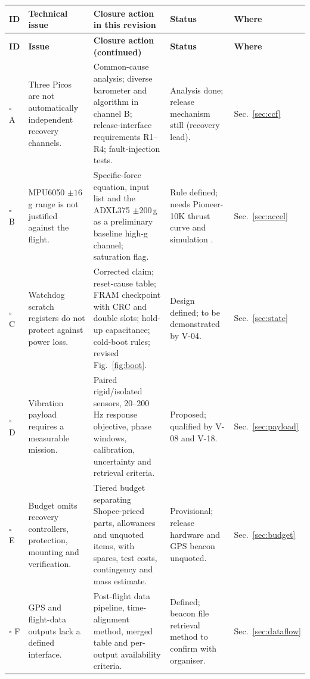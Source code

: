 \small
\begingroup
{}
\begin{longtable}{@{}L{8mm}L{36mm}L{56mm}L{28mm}L{18mm}@{}}
\toprule{}\textbf{ID}&\textbf{Technical issue}&\textbf{Closure action in this revision}&\textbf{Status}&\textbf{Where}\\\midrule\endfirsthead
\toprule{}\textbf{ID}&\textbf{Issue}&\textbf{Closure action (continued)}&\textbf{Status}&\textbf{Where}\\\midrule\endhead
\bottomrule\endlastfoot
$\square$ A & Three Picos are not automatically independent recovery channels. & Common-cause analysis; diverse barometer and algorithm in channel B; release-interface requirements R1--R4; fault-injection tests. & Analysis done; release mechanism still  (recovery lead). & Sec.~\ref{sec:ccf}\\
$\square$ B & MPU6050 $\pm16$\,g range is not justified against the flight. & Specific-force equation, input list and the ADXL375 $\pm200$\,g as a preliminary baseline high-g channel; saturation flag. & Rule defined; needs Pioneer-10K thrust curve and simulation . & Sec.~\ref{sec:accel}\\
$\square$ C & Watchdog scratch registers do not protect against power loss. & Corrected claim; reset-cause table; FRAM checkpoint with CRC and double slots; hold-up capacitance; cold-boot rules; revised Fig.~\ref{fig:boot}. & Design defined; to be demonstrated by V-04. & Sec.~\ref{sec:state}\\
$\square$ D & Vibration payload requires a measurable mission. & Paired rigid/isolated sensors, 20--200 Hz response objective, phase windows, calibration, uncertainty and retrieval criteria. & Proposed; qualified by V-08 and V-18. & Sec.~\ref{sec:payload}\\
$\square$ E & Budget omits recovery controllers, protection, mounting and verification. & Tiered budget separating Shopee-priced parts, allowances and unquoted items, with spares, test costs, contingency and mass estimate. & Provisional; release hardware and GPS beacon unquoted. & Sec.~\ref{sec:budget}\\
$\square$ F & GPS and flight-data outputs lack a defined interface. & Post-flight data pipeline, time-alignment method, merged table and per-output availability criteria. & Defined; beacon file retrieval method to confirm with organiser. & Sec.~\ref{sec:dataflow}\\
\end{longtable}
\endgroup %
\normalsize

